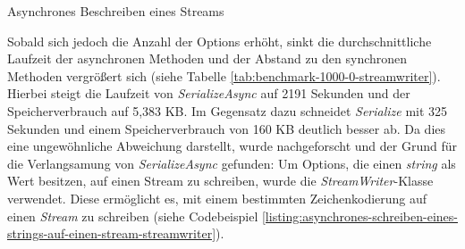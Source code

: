 \begin{listing}[h]
    \inputminted[framesep=2mm, baselinestretch=1.2, fontsize=\normalsize, linenos]{csharp}{codes/example_write_async_stream.cs}
    \caption{Asynchrones Beschreiben eines Streams}
    \label{listing:asynchrones-beschreiben-eines-streams}
\end{listing}

\begin{table}[h]
    \caption{Benchmark mit 1000 Options und mit einer Payload von 0 Bytes, jedoch mit StreamWriter}
    \label{tab:benchmark-1000-0-streamwriter}
\end{table}

Sobald sich jedoch die Anzahl der Options erhöht, sinkt die durchschnittliche Laufzeit der asynchronen Methoden und der Abstand zu den synchronen Methoden vergrößert sich (siehe Tabelle \ref{tab:benchmark-1000-0-streamwriter}). Hierbei steigt die Laufzeit von \textit{SerializeAsync} auf 2191 Sekunden und der Speicherverbrauch auf 5,383 KB. Im Gegensatz dazu schneidet \textit{Serialize} mit 325 Sekunden und einem Speicherverbrauch von 160 KB deutlich besser ab. Da dies eine ungewöhnliche Abweichung darstellt, wurde nachgeforscht und der Grund für die Verlangsamung von \textit{SerializeAsync} gefunden: Um Options, die einen \textit{string} als Wert besitzen, auf einen Stream zu schreiben, wurde die \textit{StreamWriter}-Klasse verwendet. Diese ermöglicht es, mit einem bestimmten Zeichenkodierung auf einen \textit{Stream} zu schreiben (siehe Codebeispiel \ref{listing:asynchrones-schreiben-eines-strings-auf-einen-stream-streamwriter}).

